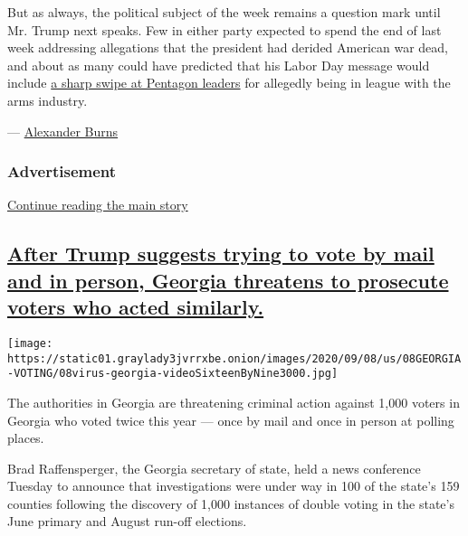 But as always, the political subject of the week remains a question mark
until Mr. Trump next speaks. Few in either party expected to spend the
end of last week addressing allegations that the president had derided
American war dead, and about as many could have predicted that his Labor
Day message would include
\href{https://www.nytimes3xbfgragh.onion/2020/09/07/us/politics/wisconsin-biden-harris-trump-pence.html}{a
sharp swipe at Pentagon leaders} for allegedly being in league with the
arms industry.

---
\href{https://www.nytimes3xbfgragh.onion/by/alexander-burns}{Alexander
Burns}

\hypertarget{advertisement-2}{%
\subsubsection{Advertisement}\label{advertisement-2}}

\protect\hyperlink{after-dfp-ad-mid3}{Continue reading the main story}

\hypertarget{after-trump-suggests-trying-to-vote-by-mail-and-in-person-georgia-threatens-to-prosecute-voters-who-acted-similarly}{%
\subsection{\texorpdfstring{\protect\hyperlink{after-trump-suggests-trying-to-vote-by-mail-and-in-person-georgia-threatens-to-prosecute-voters-who-acted-similarly}{After
Trump suggests trying to vote by mail and in person, Georgia threatens
to prosecute voters who acted
similarly.}}{After Trump suggests trying to vote by mail and in person, Georgia threatens to prosecute voters who acted similarly.}}\label{after-trump-suggests-trying-to-vote-by-mail-and-in-person-georgia-threatens-to-prosecute-voters-who-acted-similarly}}

\texttt{[image: https://static01.graylady3jvrrxbe.onion/images/2020/09/08/us/08GEORGIA-VOTING/08virus-georgia-videoSixteenByNine3000.jpg]}

The authorities in Georgia are threatening criminal action against 1,000
voters in Georgia who voted twice this year --- once by mail and once in
person at polling places.

Brad Raffensperger, the Georgia secretary of state, held a news
conference Tuesday to announce that investigations were under way in 100
of the state's 159 counties following the discovery of 1,000 instances
of double voting in the state's June primary and August run-off
elections.

